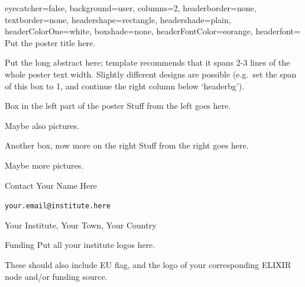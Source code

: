 \documentclass[portrait,a0paper,fontscale=0.30]{baposter}
\begin{document}
\begin{poster}{%
  eyecatcher=false,
  background=user,
  columns=2,
  headerborder=none,
  textborder=none,
  headershape=rectangle,
  headershade=plain,
  headerColorOne=white,
  boxshade=none,
  headerFontColor=eorange,
  headerfont=\Large
  }{}%
  {\vspace{2em} \color{white} \fontsize{32pt}{32pt}\selectfont
  Put the poster title here. %
  }%
  {
  }{}


%
%
%

\begin{posterbox}[name=abstract, column=0, span=2, below=headerbg]{}
Put the long abstract here; template recommends that it spans 2-3 lines of the whole poster text width. Slightly different designs are possible (e.g.~set the span of this box to 1, and continue the right column below `headerbg').
\end{posterbox}

\begin{posterbox}[name=boxleft, below=abstract, column=0]{Box in the left part of the poster}
Stuff from the left goes here.

Maybe also pictures.
\end{posterbox}
\begin{posterbox}[name=boxright, below=abstract, column=1]{Another box, now more on the right}
Stuff from the right goes here.

Maybe more pictures.
\end{posterbox}

%
%
%

\begin{posterbox}[name=footer, below=footersep, column=0]{Contact}
Your Name Here %

\texttt{your.email@institute.here}

Your Institute, Your Town, Your Country
\end{posterbox}

\begin{posterbox}[name=funding, below=footersep, column=1]{Funding}
Put all your institute logos here.

These should also include EU flag, and the logo of your corresponding ELIXIR node and/or funding source.
\end{posterbox}

\end{poster}
\end{document}
